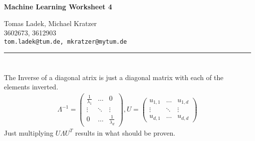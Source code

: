 \documentclass[11pt]{article}
\makeatletter
\newcommand{\exercise}{\section{}}
\newcommand{\hwhead}[4]{
\begin{center}
\sffamily\large\bfseries Machine Learning Worksheet #1
\vspace{2mm}
\normalfont

#2\\
#3\\
\texttt{#4}
\end{center}
\vspace{6mm} \hrule \vspace{4mm}
}
\newcommand{\names}{Tomas Ladek, Michael Kratzer} %
\newcommand{\imats}{3602673, 3612903} %
\newcommand{\emails}{tom.ladek@tum.de, mkratzer@mytum.de} %
\makeatother
\begin{document}
\hwhead{4}{\names}{\imats}{\emails}


\exercise
The Inverse of a diagonal atrix is just a diagonal matrix with each of the elements inverted.
\begin{align}
	\Lambda^{-1} = 
	\begin{pmatrix}
	\frac{1}{\lambda_1} & \dots & 0 \\
	\vdots & \ddots & \vdots \\
	0 & \dots & \frac{1}{\lambda_d}
	\end{pmatrix}
	,
	U = 
	\begin{pmatrix}
	u_{1,1} & \dots & u_{1,d} \\
	\vdots & \ddots & \vdots \\
	u_{d,1} & \dots & u_{d,d}
	\end{pmatrix}
\end{align}
Just multiplying $U\Lambda U^{T}$ results in what should be proven.
\end{document}
